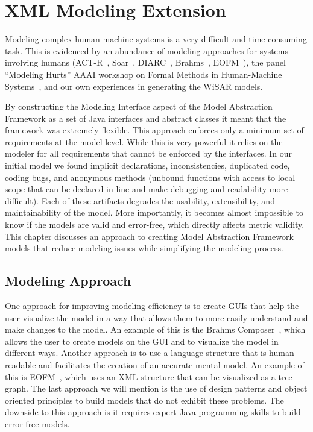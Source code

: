 \chapter{XML Modeling Extension} \label{ch:xmlparser}

Modeling complex human-machine systems is a very difficult and time-consuming task.  This is evidenced by an abundance of modeling approaches for systems involving humans (ACT-R~\cite{anderson1996act}, Soar~\cite{laird2012soar}, DIARC~\cite{schermerhorn2006diarc}, Brahms~\cite{clancey1998brahms}, EOFM~\cite{bolton2009enhanced}), the panel ``Modeling Hurts'' AAAI workshop on Formal Methods in Human-Machine Systems~\cite{aaaisymposium2014modeling}, and our own experiences in generating the WiSAR models.

By constructing the Modeling Interface aspect of the Model Abstraction Framework as a set of Java interfaces and abstract classes it meant that the framework was extremely flexible.  This approach enforces only a minimum set of requirements at the model level.  While this is very powerful it relies on the modeler for all requirements that cannot be enforced by the interfaces.  In our initial model we found implicit declarations, inconsistencies, duplicated code, coding bugs, and anonymous methods (unbound functions with access to local scope that can be declared in-line and make debugging and readability more difficult).  Each of these artifacts degrades the usability, extensibility, and maintainability of the model.  More importantly, it becomes almost impossible to know if the models are valid and error-free, which directly affects metric validity.  This chapter discusses an approach to creating Model Abstraction Framework models that reduce modeling issues while simplifying the modeling process.

\section{Modeling Approach}

One approach for improving modeling efficiency is to create GUIs that help the user visualize the model in a way that allows them to more easily understand and make changes to the model.  An example of this is the Brahms Composer~\cite{seah2005multi}, which allows the user to create models on the GUI and to visualize the model in different ways.  Another approach is to use a language structure that is human readable and facilitates the creation of an accurate mental model.  An example of this is EOFM~\cite{bolton2009enhanced}, which uses an XML structure that can be visualized as a tree graph.  The last approach we will mention is the use of design patterns and object oriented principles to build models that do not exhibit these problems.  The downside to this approach is it requires expert Java programming skills to build error-free models.

